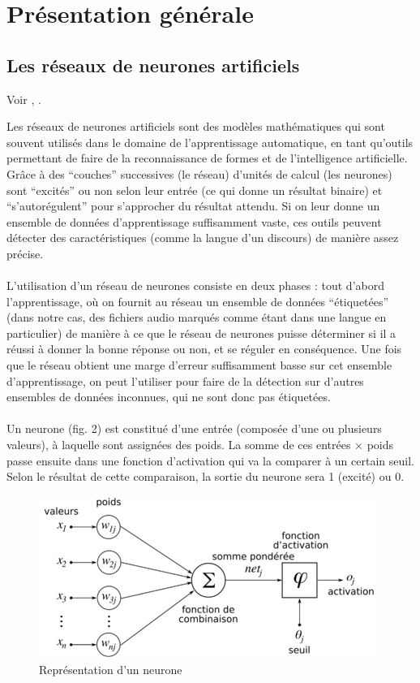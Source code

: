 \documentclass{article}
\begin{document}
\section{Présentation générale}

\subsection{Les réseaux de neurones artificiels}

Voir \cite{joulion90}, \cite{lecun2015}.

Les réseaux de neurones artificiels sont des modèles mathématiques qui sont souvent utilisés dans le domaine de l'apprentissage automatique, en tant qu'outils permettant de faire de la reconnaissance de formes et de l'intelligence artificielle. Grâce à des ``couches'' successives (le réseau) d'unités de calcul (les neurones) sont ``excités'' ou non selon leur entrée (ce qui donne un résultat binaire) et ``s'autorégulent'' pour s'approcher du résultat attendu. Si on leur donne un ensemble de données d'apprentissage suffisamment vaste, ces outils peuvent détecter des caractéristiques (comme la langue d'un discours) de manière assez précise.\\
\\
L'utilisation d'un réseau de neurones consiste en deux phases : tout d'abord l'apprentissage, où on fournit au réseau un ensemble de données ``étiquetées'' (dans notre cas, des fichiers audio marqués comme étant dans une langue en particulier) de manière à ce que le réseau de neurones puisse déterminer si il a réussi à donner la bonne réponse ou non, et se réguler en conséquence. Une fois que le réseau obtient une marge d'erreur suffisamment basse sur cet ensemble d'apprentissage, on peut l'utiliser pour faire de la détection sur d'autres ensembles de données inconnues, qui ne sont donc pas étiquetées.\\
\\
Un neurone (fig. 2) est constitué d'une entrée (composée d'une ou plusieurs valeurs), à laquelle sont assignées des poids. La somme de ces entrées $\times$ poids passe ensuite dans une fonction d'activation qui va la comparer à un certain seuil. Selon le résultat de cette comparaison, la sortie du neurone sera 1 (excité) ou 0.\\

\begin{figure}[h]
  \centerline{\includegraphics[scale=0.6]{img/neurone.png}}
  \caption{Représentation d'un neurone}
\end{figure}
\end{document}
